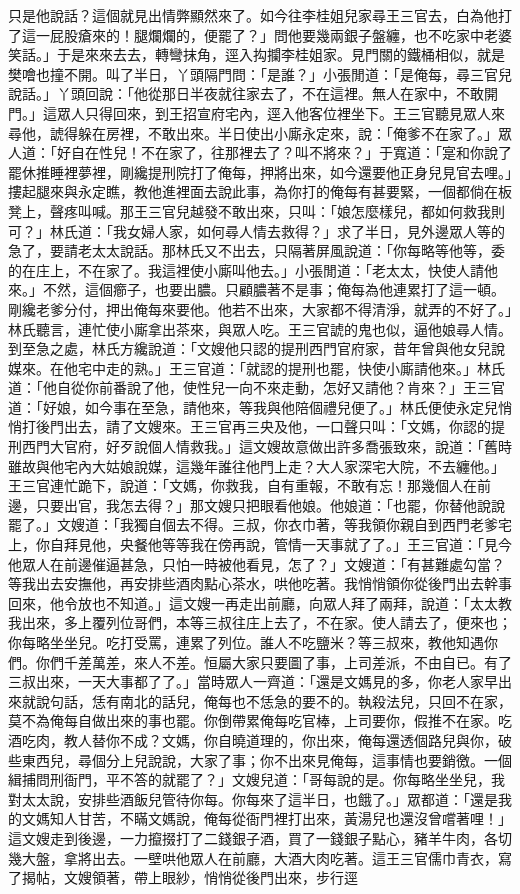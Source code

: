 \begin{showcontents}{}
只是他說話？這個就見出情弊顯然來了。如今往李桂姐兒家尋王三官去，白為他打了這一屁股瘡來的！腿爛爛的，便罷了？」問他要幾兩銀子盤纏，也不吃家中老婆笑話。」于是來來去去，轉彎抹角，逕入抅攔李桂姐家。見門關的鐵桶相似，就是樊噲也撞不開。叫了半日，丫頭隔門問：「是誰？」小張閒道：「是俺每，尋三官兒說話。」丫頭回說：「他從那日半夜就往家去了，不在這裡。無人在家中，不敢開門。」這眾人只得回來，到王招宣府宅內，逕入他客位裡坐下。王三官聽見眾人來尋他，諕得躲在房裡，不敢出來。半日使出小廝永定來，說：「俺爹不在家了。」眾人道：「好自在性兒！不在家了，往那裡去了？叫不將來？」于寬道：「寔和你說了罷休推睡裡夢裡，剛纔提刑院打了俺每，押將出來，如今還要他正身兒見官去哩。」摟起腿來與永定瞧，教他進裡面去說此事，為你打的俺每有甚要緊，一個都倘在板凳上，聲疼叫喊。那王三官兒越發不敢出來，只叫：「娘怎麼樣兒，都如何救我則可？」林氏道：「我女婦人家，如何尋人情去救得？」求了半日，見外邊眾人等的急了，要請老太太說話。那林氏又不出去，只隔著屏風說道：「你每略等他等，委的在庄上，不在家了。我這裡使小廝叫他去。」小張閒道：「老太太，快使人請他來。」不然，這個癤子，也要出膿。只顧膿著不是事；俺每為他連累打了這一頓。剛纔老爹分付，押出俺每來要他。他若不出來，大家都不得清淨，就弄的不好了。」林氏聽言，連忙使小廝拿出茶來，與眾人吃。王三官諕的鬼也似，逼他娘尋人情。到至急之處，林氏方纔說道：「文嫂他只認的提刑西門官府家，昔年曾與他女兒說媒來。在他宅中走的熟。」王三官道：「就認的提刑也罷，快使小廝請他來。」林氏道：「他自從你前番說了他，使性兒一向不來走動，怎好又請他？肯來？」王三官道：「好娘，如今事在至急，請他來，等我與他陪個禮兒便了。」林氏便使永定兒悄悄打後門出去，請了文嫂來。王三官再三央及他，一口聲只叫：「文媽，你認的提刑西門大官府，好歹說個人情救我。」這文嫂故意做出許多喬張致來，說道：「舊時雖故與他宅內大姑娘說媒，這幾年誰往他門上走？大人家深宅大院，不去纏他。」王三官連忙跪下，說道：「文媽，你救我，自有重報，不敢有忘！那幾個人在前邊，只要出官，我怎去得？」那文嫂只把眼看他娘。他娘道：「也罷，你替他說說罷了。」文嫂道：「我獨自個去不得。三叔，你衣巾著，等我領你親自到西門老爹宅上，你自拜見他，央餐他等等我在傍再說，管情一天事就了了。」王三官道：「見今他眾人在前邊催逼甚急，只怕一時被他看見，怎了？」文嫂道：「有甚難處勾當？等我出去安撫他，再安排些酒肉點心茶水，哄他吃著。我悄悄領你從後門出去幹事回來，他令放也不知道。」這文嫂一再走出前廳，向眾人拜了兩拜，說道：「太太教我出來，多上覆列位哥們，本等三叔往庄上去了，不在家。使人請去了，便來也；你每略坐坐兒。吃打受罵，連累了列位。誰人不吃鹽米？等三叔來，教他知遇你們。你們千差萬差，來人不差。恒屬大家只要圖了事，上司差派，不由自已。有了三叔出來，一天大事都了了。」當時眾人一齊道：「還是文媽見的多，你老人家早出來就說句話，恁有南北的話兒，俺每也不恁急的要不的。執殺法兒，只回不在家，莫不為俺每自做出來的事也罷。你倒帶累俺每吃官棒，上司要你，假推不在家。吃酒吃肉，教人替你不成？文媽，你自曉道理的，你出來，俺每還透個路兒與你，破些東西兒，尋個分上兒說說，大家了事；你不出來見俺每，這事情也要銷徼。一個緝捕問刑衙門，平不答的就罷了？」文嫂兒道：「哥每說的是。你每略坐坐兒，我對太太說，安排些酒飯兒管待你每。你每來了這半日，也餓了。」眾都道：「還是我的文媽知人甘苦，不瞞文媽說，俺每從衙門裡打出來，黃湯兒也還沒曾嚐著哩！」這文嫂走到後邊，一力攛掇打了二錢銀子酒，買了一錢銀子點心，豬羊牛肉，各切幾大盤，拿將出去。一壁哄他眾人在前廳，大酒大肉吃著。這王三官儒巾青衣，寫了揭帖，文嫂領著，帶上眼紗，悄悄從後門出來，步行逕
\end{showcontents}
